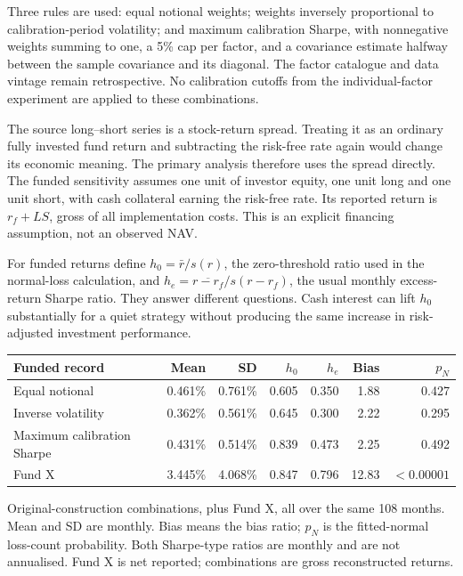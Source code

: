 \documentclass[11pt,letterpaper]{article}
\newcommand{\subhead}[1]{\vspace{5pt}{\large\bfseries #1}\par}
\newcommand{\note}[1]{{\small #1\par}}
\begin{document}
Three rules are used: equal notional weights; weights inversely proportional to calibration-period volatility; and maximum calibration Sharpe, with nonnegative weights summing to one, a 5\% cap per factor, and a covariance estimate halfway between the sample covariance and its diagonal. The factor catalogue and data vintage remain retrospective. No calibration cutoffs from the individual-factor experiment are applied to these combinations.

\subhead{Why the cash convention matters}
The source long--short series is a stock-return spread. Treating it as an ordinary fully invested fund return and subtracting the risk-free rate again would change its economic meaning. The primary analysis therefore uses the spread directly. The funded sensitivity assumes one unit of investor equity, one unit long and one unit short, with cash collateral earning the risk-free rate. Its reported return is $r_f+LS$, gross of all implementation costs. This is an explicit financing assumption, not an observed NAV.

For funded returns define $h_0=\bar r/s(r)$, the zero-threshold ratio used in the normal-loss calculation, and $h_e=\overline{r-r_f}/s(r-r_f)$, the usual monthly excess-return Sharpe ratio. They answer different questions. Cash interest can lift $h_0$ substantially for a quiet strategy without producing the same increase in risk-adjusted investment performance.

\begin{center}
\small
\begin{tabular}{lrrrrrr}
\toprule
Funded record & Mean & SD & $h_0$ & $h_e$ & Bias & $p_N$ \\
\midrule
Equal notional & 0.461\% & 0.761\% & 0.605 & 0.350 & 1.88 & 0.427 \\
Inverse volatility & 0.362\% & 0.561\% & 0.645 & 0.300 & 2.22 & 0.295 \\
Maximum calibration Sharpe & 0.431\% & 0.514\% & 0.839 & 0.473 & 2.25 & 0.492 \\
Fund X & 3.445\% & 4.068\% & 0.847 & 0.796 & 12.83 & $<0.00001$ \\
\bottomrule
\end{tabular}
\end{center}
\note{Original-construction combinations, plus Fund X, all over the same 108 months. Mean and SD are monthly. Bias means the bias ratio; $p_N$ is the fitted-normal loss-count probability. Both Sharpe-type ratios are monthly and are not annualised. Fund X is net reported; combinations are gross reconstructed returns.}
\end{document}
